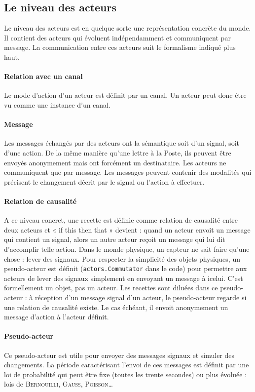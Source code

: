 \documentclass[11pt]{article}
\begin{document}
\subsection{Le niveau des acteurs} Le niveau des acteurs est en quelque sorte une représentation concrète du monde. Il contient des acteurs qui évoluent indépendamment et communiquent par message. La communication entre ces acteurs suit le formalisme indiqué plus haut.

\paragraph{Relation avec un canal} Le mode d'action d'un acteur est définit par un canal. Un acteur peut donc être vu comme une instance d'un canal.

\paragraph{Message} Les messages échangés par des acteurs ont la sémantique soit d'un signal, soit d'une action. De la même manière qu'une lettre à la Poste, ils peuvent être envoyés anonymement mais ont forcément un destinataire. Les acteurs ne communiquent que par message. Les messages peuvent contenir des modalités qui précisent le changement décrit par le signal ou l'action à effectuer.

\paragraph{Relation de causalité} A ce niveau concret, une recette est définie comme relation de causalité entre deux acteurs et « if this then that » devient : quand un acteur envoit un message qui contient un signal, alors un autre acteur reçoit un message qui lui dit d'accomplir telle action. Dans le monde physique, un capteur ne sait faire qu'une chose : lever des signaux. Pour respecter la simplicité des objets physiques, un pseudo-acteur est définit (\texttt{actors.Commutator} dans le code) pour permettre aux acteurs de lever des signaux simplement en envoyant un message à icelui. C'est formellement un objet, pas un acteur. Les recettes sont \og diluées \fg{} dans ce pseudo-acteur : à réception d'un message signal d'un acteur, le pseudo-acteur regarde si une relation de causalité existe. Le cas échéant, il envoit anonymement un message d'action à l'acteur définit.

\paragraph{Pseudo-acteur} Ce pseudo-acteur est utile pour envoyer des messages signaux et simuler des changements. La période caractérisant l'envoi de ces messages est définit par une loi de probabilité qui peut être fixe (toutes les trente secondes) ou plus évoluée : lois de \textsc{Bernouilli}, \textsc{Gauss}, \textsc{Poisson}\dots
\end{document}
